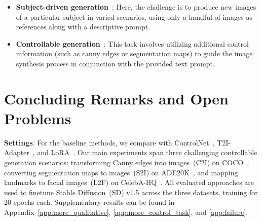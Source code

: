 \begin{itemize}[leftmargin=*,nosep]
\textbf{Finetuning stability and convergence}. We begin by assessing both the stability and convergence rate during finetuning across DreamBooth, LoRA, OFT, and COFT, as depicted in Figure~\ref{fig:teaser} and Figure~\ref{fig:db_convergence}. Our analysis indicates that COFT and OFT provide stable finetuning behavior for the diffusion model. After completing 400 iterations, both DreamBooth and OFT-based approaches attain effective control over the output, whereas LoRA does not maintain subject identity adequately. With 2000 iterations, DreamBooth exhibits mode collapse in its generated samples, and LoRA struggles to render the correct attribute (yellow shirt), mistakenly generating yellow fur instead. By contrast, OFT and COFT maintain robust and consistent controllability of the generated content. These findings substantiate that our OFT approach achieves rapid yet robust convergence in subject-driven generation tasks. Importantly, our results reveal that the methods' resilience to the choice of iteration count is significant, as it obviates the need to individually adjust the number of finetuning steps for various subjects. For OFT and COFT, a relatively large number of iterations can be fixed in advance without requiring meticulous adjustment. Furthermore, COFT, with a suitable $\epsilon$ parameter, renders both the learning rate and iteration number essentially tuneless.

    \item \textbf{Subject-driven generation}~\cite{ruiz2023dreambooth}: Here, the challenge is to produce new images of a particular subject in varied scenarios, using only a handful of images as references along with a descriptive prompt.
    \item \textbf{Controllable generation}~\cite{zhang2023adding,mou2023t2i}: This task involves utilizing additional control information (such as canny edges or segmentation maps) to guide the image synthesis process in conjunction with the provided text prompt.
\end{itemize}

\section{Concluding Remarks and Open Problems}

\textbf{Settings}. For the baseline methods, we compare with ControlNet~\cite{zhang2023adding}, T2I-Adapter~\cite{mou2023t2i}, and LoRA~\cite{hulora2022}. Our main experiments span three challenging controllable generation scenarios: transforming Canny edges into images~(C2I) on COCO~\cite{lin2014microsoft}, converting segmentation maps to images~(S2I) on ADE20K~\cite{zhou2017scene}, and mapping landmarks to facial images~(L2F) on CelebA-HQ~\cite{karras2018progressive,xia2021tedigan}. All evaluated approaches are used to finetune Stable Diffusion~(SD) v1.5 across the three datasets, training for 20 epochs each. Supplementary results can be found in Appendix~\ref{app:more_qualitative}, \ref{app:more_control_task}, and \ref{app:failure}.

